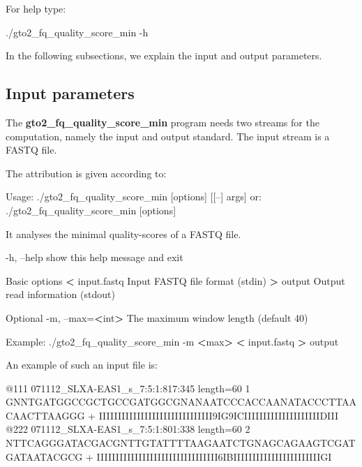 \documentclass[11pt,]{krantz}
\newenvironment{Shaded}{\begin{snugshade}}{\end{snugshade}}
\newcommand{\OperatorTok}[1]{\textcolor[rgb]{0.43,0.43,0.43}{\textbf{#1}}}
\newcommand{\ExtensionTok}[1]{#1}
\newcommand{\NormalTok}[1]{#1}
\begin{document}
For help type:

\begin{Shaded}
\begin{Highlighting}[]
\ExtensionTok{./gto2_fq_quality_score_min}\NormalTok{ -h}
\end{Highlighting}
\end{Shaded}

In the following subsections, we explain the input and output
parameters.

\subsection*{Input parameters}\label{input-parameters-15}


The \textbf{gto2\_fq\_quality\_score\_min} program needs two streams for
the computation, namely the input and output standard. The input stream
is a FASTQ file.

The attribution is given according to:

\begin{Shaded}
\begin{Highlighting}[]
\ExtensionTok{Usage}\NormalTok{: ./gto2_fq_quality_score_min [options] [[--] args]}
   \ExtensionTok{or}\NormalTok{: ./gto2_fq_quality_score_min [options]}

\ExtensionTok{It}\NormalTok{ analyses the minimal quality-scores of a FASTQ file.}

    \ExtensionTok{-h}\NormalTok{, --help        show this help message and exit}

\ExtensionTok{Basic}\NormalTok{ options}
    \OperatorTok{<} \ExtensionTok{input.fastq}\NormalTok{     Input FASTQ file format (stdin)}
    \OperatorTok{>} \ExtensionTok{output}\NormalTok{          Output read information (stdout)}

\ExtensionTok{Optional}
    \ExtensionTok{-m}\NormalTok{, --max=}\OperatorTok{<}\NormalTok{int}\OperatorTok{>}\NormalTok{   The maximum window length (default 40)}

\ExtensionTok{Example}\NormalTok{: ./gto2_fq_quality_score_min -m }\OperatorTok{<}\NormalTok{max}\OperatorTok{>} \OperatorTok{<}\NormalTok{ input.fastq }
\OperatorTok{>} \ExtensionTok{output}
\end{Highlighting}
\end{Shaded}

An example of such an input file is:

\begin{Shaded}
\begin{Highlighting}[]
\ExtensionTok{@111}\NormalTok{ 071112_SLXA-EAS1_s_7:5:1:817:345 length=60 1}
\ExtensionTok{GNNTGATGGCCGCTGCCGATGGCGNANAATCCCACCAANATACCCTTAACAACTTAAGGG}
\ExtensionTok{+}
\ExtensionTok{IIIIIIIIIIIIIIIIIIIIIIIIIIIIII9IG9ICIIIIIIIIIIIIIIIIIIIIDIII}
\ExtensionTok{@222}\NormalTok{ 071112_SLXA-EAS1_s_7:5:1:801:338 length=60 2}
\ExtensionTok{NTTCAGGGATACGACGNTTGTATTTTAAGAATCTGNAGCAGAAGTCGATGATAATACGCG}
\ExtensionTok{+}
\ExtensionTok{IIIIIIIIIIIIIIIIIIIIIIIIIIIIIIII6IBIIIIIIIIIIIIIIIIIIIIIIIGI}
\end{Highlighting}
\end{Shaded}
\end{document}
